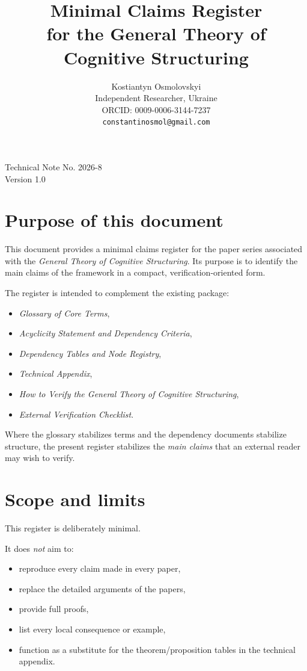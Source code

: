 \documentclass[11pt,a4paper]{article}
\title{Minimal Claims Register\\ for the General Theory of Cognitive Structuring}
\author{
	Kostiantyn Osmolovskyi\\
	\small Independent Researcher, Ukraine\\
	\small ORCID: 0009-0006-3144-7237\\
	\small \texttt{constantinosmol@gmail.com}
}
\date{}
\begin{document}
	\maketitle
	
\begin{center}
	\small
	Technical Note No. 2026-8\\
	Version 1.0
\end{center}

\vspace{0.5em}	
	
	\section{Purpose of this document}
	
	This document provides a minimal claims register for the paper series associated with the
	\emph{General Theory of Cognitive Structuring}. Its purpose is to identify the main claims of
	the framework in a compact, verification-oriented form.
	
	The register is intended to complement the existing package:
	\begin{itemize}[leftmargin=2em]
		\item \emph{Glossary of Core Terms},
		\item \emph{Acyclicity Statement and Dependency Criteria},
		\item \emph{Dependency Tables and Node Registry},
		\item \emph{Technical Appendix},
		\item \emph{How to Verify the General Theory of Cognitive Structuring},
		\item \emph{External Verification Checklist}.
	\end{itemize}
	
	Where the glossary stabilizes terms and the dependency documents stabilize structure, the
	present register stabilizes the \emph{main claims} that an external reader may wish to verify.
	
	\section{Scope and limits}
	
	This register is deliberately minimal.
	
	It does \emph{not} aim to:
	\begin{itemize}[leftmargin=2em]
		\item reproduce every claim made in every paper,
		\item replace the detailed arguments of the papers,
		\item provide full proofs,
		\item list every local consequence or example,
		\item function as a substitute for the theorem/proposition tables in the technical appendix.
	\end{itemize}
	
\end{document}
